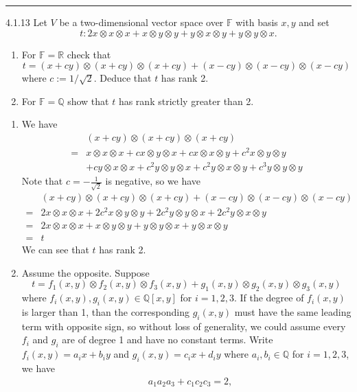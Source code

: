 \documentclass[a4paper, 12pt]{article}
\begin{document}
\noindent\rule{7in}{2.8pt}
\begin{problem}{4.1.13}
Let \(V\) be a two-dimensional vector space over \(\mathbb{F}\) with basis \(x,y\) and set 
\[t:2x\otimes x\otimes x+x\otimes y\otimes y+y\otimes x\otimes y+y\otimes y\otimes x.\]
\begin{enumerate}[(1)]
	\item For \(\mathbb{F}=\mathbb{R}\) check that 
	      \[t=(x+cy)\otimes (x+cy)\otimes (x+cy)+(x-cy)\otimes (x-cy)\otimes (x-cy)\]
		  where \(c:=1/\sqrt{2}\). Deduce that \(t\) has rank 2.
     \item For \(\mathbb{F}=\mathbb{Q}\) show that \(t\) has rank strictly greater than 2.
\end{enumerate}
\end{problem}
\begin{solution}
\begin{enumerate}[(1)]
\item We have 
\begin{align*}
    &(x+cy)\otimes (x+cy)\otimes (x+cy)\\ 
   =&x\otimes x\otimes x+cx\otimes y\otimes x+cx\otimes x\otimes y+c^2x\otimes y\otimes y\\ 
    &+cy\otimes x\otimes x+c^2y\otimes y\otimes x+c^2 y\otimes x\otimes y+c^3y\otimes y\otimes y 
\end{align*}
Note that \(c=-\frac{1}{\sqrt{2}}\) is negative, so we have 
\begin{align*}
    &(x+cy)\otimes (x+cy)\otimes (x+cy)+(x-cy)\otimes (x-cy)\otimes (x-cy)\\ 
   =&2x\otimes x\otimes x+2c^2x\otimes y\otimes y+2c^2y\otimes y\otimes x+2c^2y\otimes x\otimes y\\ 
   =&2x\otimes x\otimes x+x\otimes y\otimes y+y\otimes y\otimes x+y\otimes x\otimes y\\ 
   =&t 
\end{align*}
We can see that \(t\) has rank 2.
\item Assume the opposite. Suppose 
\[t=f_1(x,y)\otimes f_2(x,y)\otimes f_3(x,y)+g_1(x,y)\otimes g_2(x,y)\otimes g_3(x,y)\]
where \(f_i(x,y),g_i(x,y)\in \mathbb{Q}[x,y]\) for \(i=1,2,3\). If the degree of \(f_i(x,y)\) is larger than 1, than the corresponding \(g_i(x,y)\) must have the same leading term with opposite sign, so 
without loss of generality, we could assume every \(f_i\) and \(g_i\) are of degree 1 and have no constant terms. Write \(f_i(x,y)=a_ix+b_iy\) and \(g_i(x,y)=c_ix+d_iy\) where \(a_i,b_i\in \mathbb{Q}\) for \(i=1,2,3\), we have 
\begin{align*}
    &a_1a_2a_3+c_1c_2c_3=2,\\
    &
\end{align*} 
\end{enumerate}
\end{solution}
\end{document}
